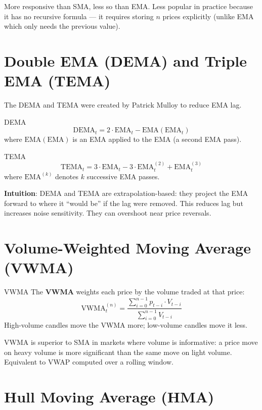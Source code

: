 \documentclass[12pt,a4paper,openany]{report}
\theoremstyle{definition}
\begin{document}
More responsive than SMA, less so than EMA. Less popular in practice because it has no recursive formula — it requires storing $n$ prices explicitly (unlike EMA which only needs the previous value).

\section{Double EMA (DEMA) and Triple EMA (TEMA)}

The DEMA and TEMA were created by Patrick Mulloy to reduce EMA lag.

\begin{definitionbox}{DEMA}
\[
  \text{DEMA}_t = 2 \cdot \text{EMA}_t - \text{EMA}(\text{EMA}_t)
\]
where $\text{EMA}(\text{EMA})$ is an EMA applied to the EMA (a second EMA pass).
\end{definitionbox}

\begin{definitionbox}{TEMA}
\[
  \text{TEMA}_t = 3\cdot\text{EMA}_t - 3\cdot\text{EMA}^{(2)}_t + \text{EMA}^{(3)}_t
\]
where $\text{EMA}^{(k)}$ denotes $k$ successive EMA passes.
\end{definitionbox}

\textbf{Intuition}: DEMA and TEMA are extrapolation-based: they project the EMA forward to where it ``would be'' if the lag were removed. This reduces lag but increases noise sensitivity. They can overshoot near price reversals.

\section{Volume-Weighted Moving Average (VWMA)}

\begin{definitionbox}{VWMA}
The \textbf{VWMA} weights each price by the volume traded at that price:
\[
  \text{VWMA}_t^{(n)} = \frac{\sum_{i=0}^{n-1} p_{t-i} \cdot V_{t-i}}{\sum_{i=0}^{n-1} V_{t-i}}
\]
High-volume candles move the VWMA more; low-volume candles move it less.
\end{definitionbox}

VWMA is superior to SMA in markets where volume is informative: a price move on heavy volume is more significant than the same move on light volume. Equivalent to VWAP computed over a rolling window.

\section{Hull Moving Average (HMA)}
\end{document}
